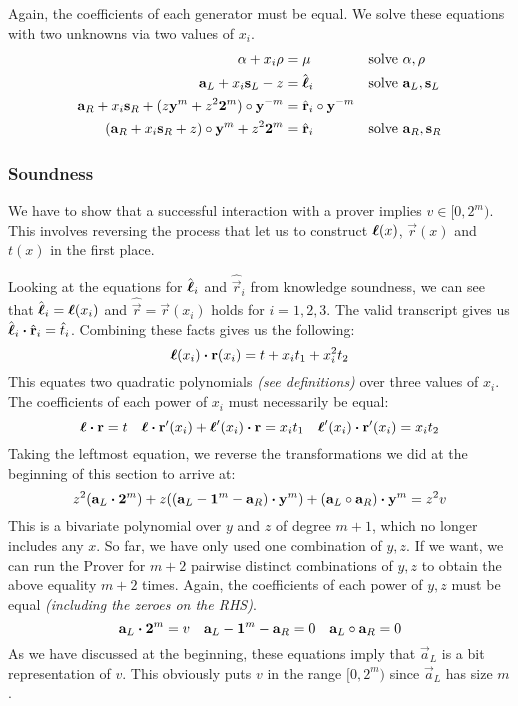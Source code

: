 %
Again,
the coefficients of each generator must be equal.
We solve these equations with two unknowns via two values of $x_i$.
%
\begin{align*}
    \alpha + x_i \rho &= \mu && \text{solve}\ \alpha, \rho \\
    \mathbf{a}_L + x_i \mathbf{s}_L - z &= \hat{\mathbf{\boldsymbol{\ell}}}_i && \text{solve}\ \mathbf{a}_L, \mathbf{s}_L \\
    \mathbf{a}_R + x_i \mathbf{s}_R + (z \mathbf{y}^m + z^2 \mathbf{2}^m) \circ \mathbf{y}^{-m} &= \hat{\mathbf{r}}_i \circ \mathbf{y}^{-m} \\
    (\mathbf{a}_R + x_i \mathbf{s}_R + z) \circ \mathbf{y}^m + z^2\mathbf{2}^m &= \hat{\mathbf{r}}_i && \text{solve}\ \mathbf{a}_R, \mathbf{s}_R
\end{align*}

\subsubsection{Soundness}

We have to show that a successful interaction with a prover implies $v \in [0, 2^m)$.
This involves reversing the process that let us to construct $\mathbf{\mathbf{\boldsymbol{\ell}}}(x)$, $\vec{r}(x)$ and $t(x)$ in the first place.

Looking at the equations for $\hat{\mathbf{\boldsymbol{\ell}}}_i$ and $\hat{\vec{r}}_i$ from knowledge soundness,
we can see that $\hat{\mathbf{\boldsymbol{\ell}}}_i = \mathbf{\boldsymbol{\ell}}(x_i)$ and $\hat{\vec{r}} = \vec{r}(x_i)$ holds for $i = 1, 2, 3$.
The valid transcript gives us $\hat{\mathbf{\boldsymbol{\ell}}}_i \boldsymbol{\cdot} \hat{\mathbf{r}}_i = \hat{t}_i$.
%
Combining these facts gives us the following:
%
\[
    \mathbf{\mathbf{\boldsymbol{\ell}}}(x_i) \boldsymbol{\cdot} \mathbf{r}(x_i) = t + x_i t_1 + x_i^2 t_2
\]
%
This equates two quadratic polynomials \emph{(see definitions)} over three values of $x_i$.
The coefficients of each power of $x_i$ must necessarily be equal:
%
\[
    \mathbf{\mathbf{\boldsymbol{\ell}}} \boldsymbol{\cdot} \mathbf{r} = t \quad
    \mathbf{\mathbf{\boldsymbol{\ell}}} \boldsymbol{\cdot} \mathbf{r}'(x_i) + \mathbf{\mathbf{\boldsymbol{\ell}}}'(x_i) \boldsymbol{\cdot} \mathbf{r} = x_i t_1 \quad
    \mathbf{\mathbf{\boldsymbol{\ell}}}'(x_i) \boldsymbol{\cdot} \mathbf{r}'(x_i) = x_i t_2
\]
%
Taking the leftmost equation,
we reverse the transformations we did at the beginning of this section to arrive at:
%
\[
    z^2 (\mathbf{a}_L \boldsymbol{\cdot} \mathbf{2}^m) + z((\mathbf{a}_L - \mathbf{1}^m - \mathbf{a}_R) \boldsymbol{\cdot} \mathbf{y}^m) + (\mathbf{a}_L \circ \mathbf{a}_R) \boldsymbol{\cdot} \mathbf{y}^m = z^2v
\]
%
This is a bivariate polynomial over $y$ and $z$ of degree $m + 1$,
which no longer includes any $x$.
So far,
we have only used one combination of $y, z$.
If we want,
we can run the Prover for $m + 2$ pairwise distinct combinations of $y, z$ to obtain the above equality $m + 2$ times.
Again,
the coefficients of each power of $y, z$ must be equal \emph{(including the zeroes on the RHS)}.
%
\[
    \mathbf{a}_L \boldsymbol{\cdot} \mathbf{2}^m = v \quad
    \mathbf{a}_L - \mathbf{1}^m - \mathbf{a}_R = 0 \quad
    \mathbf{a}_L \circ \mathbf{a}_R = 0
\]
%
As we have discussed at the beginning,
these equations imply that $\vec{a}_L$ is a bit representation of $v$.
This obviously puts $v$ in the range $[0, 2^m)$ since $\vec{a}_L$ has size $m$.

